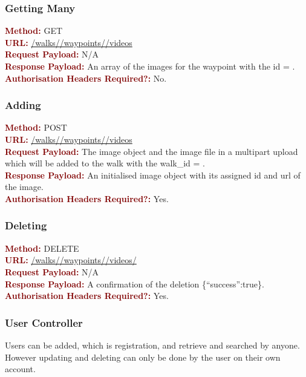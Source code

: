\documentclass[11pt,a4paper]{report}
\begin{document}
\subsubsection{Getting Many}
\textbf{\textcolor{Maroon}{Method:}} GET\\
\textbf{\textcolor{Maroon}{URL:}} \url{/walks/}\url{/waypoints/}\url{/videos}\\
\textbf{\textcolor{Maroon}{Request Payload:}} N/A\\
\textbf{\textcolor{Maroon}{Response Payload:}} An array of the images for the waypoint with the id = .\\
\textbf{\textcolor{Maroon}{Authorisation Headers Required?:}} No.

\subsubsection{Adding}
\textbf{\textcolor{Maroon}{Method:}} POST\\
\textbf{\textcolor{Maroon}{URL:}} \url{/walks/}\url{/waypoints/}\url{/videos}\\
\textbf{\textcolor{Maroon}{Request Payload:}} The image object and the image file in a multipart upload which will be added to the walk with the walk\_id = .\\
\textbf{\textcolor{Maroon}{Response Payload:}} An initialised image object with its assigned id and url of the image.\\
\textbf{\textcolor{Maroon}{Authorisation Headers Required?:}} Yes.

\subsubsection{Deleting}
\textbf{\textcolor{Maroon}{Method:}} DELETE\\
\textbf{\textcolor{Maroon}{URL:}} \url{/walks/}\url{/waypoints/}\url{/videos/}\\
\textbf{\textcolor{Maroon}{Request Payload:}} N/A\\
\textbf{\textcolor{Maroon}{Response Payload:}} A confirmation of the deletion \{``success'':true\}.\\
\textbf{\textcolor{Maroon}{Authorisation Headers Required?:}} Yes.

\subsubsection{User Controller}
Users can be added, which is registration, and retrieve and searched by anyone. However updating and deleting can only be done by the user on their own account.
\end{document}
